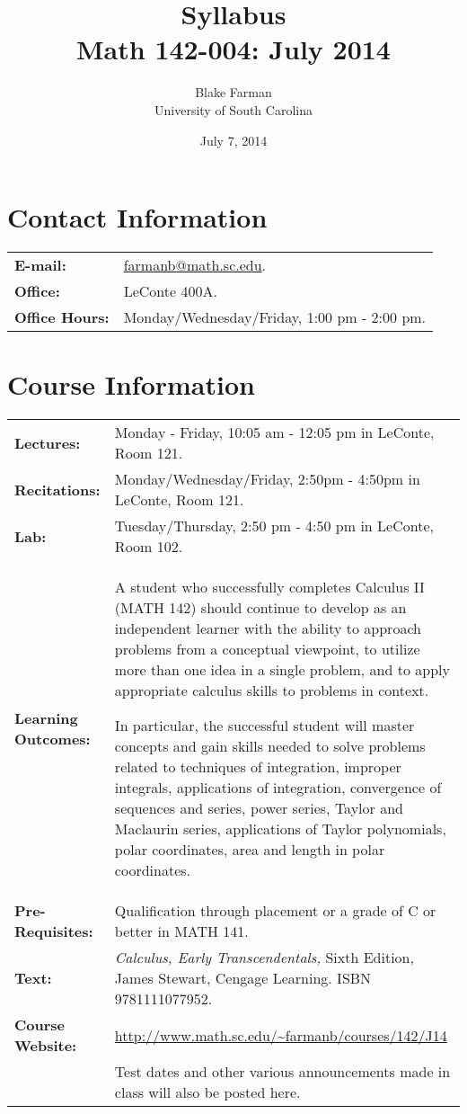 \documentclass[10pt]{amsart}
\author{Blake Farman\\University of South Carolina}
\title{Syllabus\\Math 142-004: July 2014}
\date{July 7, 2014}
\begin{document}
\maketitle

\section*{Contact Information}
\noindent
\begin{tabular}{p{1.4in}p{5in}}
  {\bf E-mail:} &\href{mailto:farmanb@math.sc.edu}{farmanb@math.sc.edu}.\\
  {\bf Office:} & LeConte 400A.\\
  {\bf Office Hours:} & Monday/Wednesday/Friday, 1:00 pm - 2:00 pm.\\
\end{tabular}

\section*{Course Information}
\noindent
\begin{tabular}{p{1.4in}p{5in}}
  {\bf Lectures:} &
  Monday - Friday,  10:05 am - 12:05 pm in LeConte, Room 121.\\
  {\bf Recitations:} &
  Monday/Wednesday/Friday, 2:50pm - 4:50pm in LeConte, Room 121.\\
  {\bf Lab:} &
  Tuesday/Thursday, 2:50 pm - 4:50 pm in LeConte, Room 102.\\
  {\bf Learning Outcomes:} & A student who successfully completes Calculus II (MATH 142) should continue to develop as an independent learner 
  with the ability to approach problems from a conceptual viewpoint, to utilize more than one idea in a single problem, and to apply appropriate 
  calculus skills to problems in context.
  
  In particular, the successful student will master concepts and gain skills needed to solve problems related to 
  techniques of integration, 
  improper integrals, 
  applications of integration, 
  convergence of sequences and series,
  power series,
  Taylor and Maclaurin series,
  applications of Taylor polynomials,
  polar coordinates,
  area and length in polar coordinates.\\
  {\bf Pre-Requisites:} & Qualification through placement or a grade of C or better in MATH 141.\\
  {\bf Text:} & {\it Calculus, Early Transcendentals,} Sixth Edition, James Stewart, Cengage Learning.  ISBN 9781111077952.\\
  {\bf Course Website:} & \url{http://www.math.sc.edu/~farmanb/courses/142/J14}\\
  & Test dates and other various announcements made in class will also be posted here.\\
\end{tabular}
\end{document}
